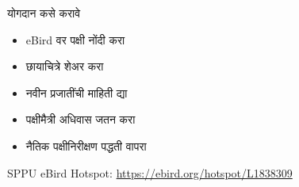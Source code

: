 \documentclass[aspectratio=169]{beamer}
\begin{document}
\begin{frame}{योगदान कसे करावे}
    \begin{itemize}
        \item {\latintext eBird} वर पक्षी नोंदी करा
        \item छायाचित्रे शेअर करा
        \item नवीन प्रजातींची माहिती द्या
        \item पक्षीमैत्री अधिवास जतन करा
        \item नैतिक पक्षीनिरीक्षण पद्धती वापरा
    \end{itemize}
    \vspace{1em}
    \centering
    {\latintext SPPU eBird Hotspot:} {\latintext\url{https://ebird.org/hotspot/L1838309}}
\end{frame}
\end{document}
